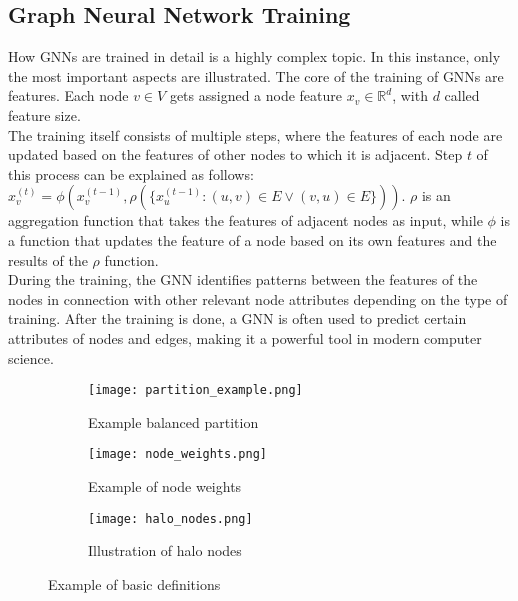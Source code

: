 \documentclass[acmsmall,nonacm,screen,review]{acmart}
\begin{document}
\subsection{Graph Neural Network Training}
How GNNs are trained in detail is a highly complex topic. In this instance, only the most important aspects are illustrated. The core of the training of GNNs are features. Each node $v \in V$ gets assigned a node feature $x_{v} \in \mathbb{R}^{d}$, with $d$ called feature size. \\
The training itself consists of multiple steps, where the features of each node are updated based on the features of other nodes to which it is adjacent. Step $t$ of this process can be explained as follows: $x_{v}^{(t)} = \phi(x_{v}^{(t-1)},\rho(\{x_{u}^{(t-1)} : (u,v) \in E \vee (v,u)\in E\}))$. $\rho$ is an aggregation function that takes the features of adjacent nodes as input, while $\phi$ is a function that updates the feature of a node based on its own features and the results of the $\rho$ function.\\ 
During the training, the GNN identifies patterns between the features of the nodes in connection with other relevant node attributes depending on the type of training. After the training is done, a GNN is often used to predict certain attributes of nodes and edges, making it a powerful tool in modern computer science.
\begin{figure}[bt!]
     \centering
     \begin{subfigure}[b]{0.3\textwidth}
         \centering
         \texttt{[image: partition\_example.png]}
         \caption{Example balanced partition}
         \label{partition}
     \end{subfigure}
     \hfill
     \begin{subfigure}[b]{0.3\textwidth}
         \centering
         \texttt{[image: node\_weights.png]}
         \caption{Example of node weights}
         \label{weights}
     \end{subfigure}
     \begin{subfigure}[b]{0.3\textwidth}
        \centering
        \texttt{[image: halo\_nodes.png]}
        \caption{Illustration of halo nodes}
        \label{halo}
     \end{subfigure}
     \caption{Example of basic definitions}
     \label{definitions}
\end{figure}
\end{document}

